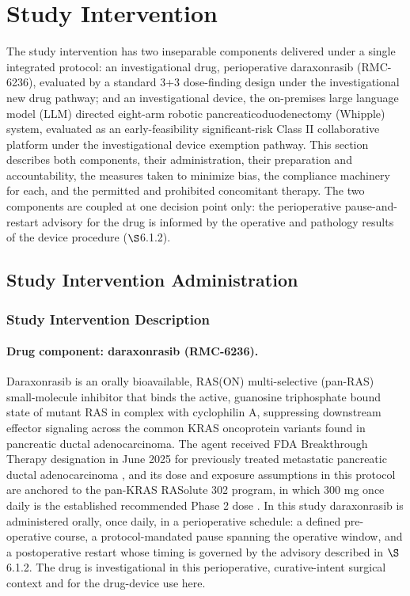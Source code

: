 \section{Study Intervention}

The study intervention has two inseparable components delivered under a single
integrated protocol: an investigational drug, perioperative daraxonrasib
(RMC-6236), evaluated by a standard 3+3 dose-finding design under the
investigational new drug pathway; and an investigational device, the on-premises
large language model (LLM) directed eight-arm robotic pancreaticoduodenectomy
(Whipple) system, evaluated as an early-feasibility significant-risk Class II
collaborative platform under the investigational device exemption pathway. This
section describes both components, their administration, their preparation and
accountability, the measures taken to minimize bias, the compliance machinery for
each, and the permitted and prohibited concomitant therapy. The two components
are coupled at one decision point only: the perioperative pause-and-restart
advisory for the drug is informed by the operative and pathology results of the
device procedure ($\S$6.1.2).

\subsection{Study Intervention Administration}

\subsubsection{Study Intervention Description}

\paragraph{Drug component: daraxonrasib (RMC-6236).}
Daraxonrasib is an orally bioavailable, RAS(ON) multi-selective (pan-RAS)
small-molecule inhibitor that binds the active, guanosine triphosphate bound state
of mutant RAS in complex with cyclophilin A, suppressing downstream effector
signaling across the common KRAS oncoprotein variants found in pancreatic ductal
adenocarcinoma. The agent received FDA Breakthrough Therapy designation in
June 2025 for previously treated metastatic pancreatic ductal adenocarcinoma
\cite{revbreakthrough}, and its dose and exposure assumptions in this protocol are
anchored to the pan-KRAS RASolute 302 program, in which 300 mg once daily is the
established recommended Phase 2 dose \cite{rasolute302}. In this study daraxonrasib
is administered orally, once daily, in a perioperative schedule: a defined
pre-operative course, a protocol-mandated pause spanning the operative window, and
a postoperative restart whose timing is governed by the advisory described in
$\S$6.1.2. The drug is investigational in this perioperative, curative-intent
surgical context and for the drug-device use here.

